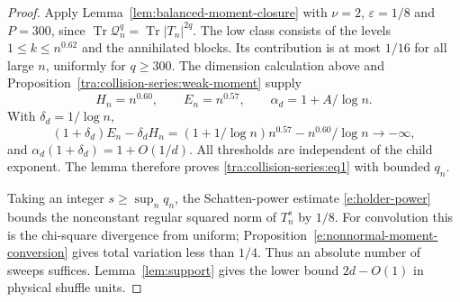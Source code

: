 \begin{proof}
Apply Lemma~\ref{lem:balanced-moment-closure} with
$\nu=2$, $\varepsilon=1/8$ and $P=300$, since
$\operatorname{Tr}\mathcal Q_n^q=\operatorname{Tr}|T_n|^{2q}$.
The low class consists of the levels $1\le k\le n^{0.62}$ and
the annihilated blocks. Its contribution is at most $1/16$ for all
large $n$, uniformly for $q\ge300$. The dimension calculation above
and Proposition~\ref{tra:collision-series:weak-moment} supply
\[
 H_n=n^{0.60},\qquad E_n=n^{0.57},\qquad
 \alpha_d=1+A/\log n.
\]
With $\delta_d=1/\log n$,
\[
 (1+\delta_d)E_n-\delta_dH_n
 =(1+1/\log n)n^{0.57}-n^{0.60}/\log n\longrightarrow-\infty,
\]
and $\alpha_d(1+\delta_d)=1+O(1/d)$. All thresholds are
independent of the child exponent. The lemma therefore proves
\eqref{tra:collision-series:eq1} with bounded $q_n$.

Taking an integer $s\ge\sup_nq_n$, the Schatten-power estimate
\eqref{e:holder-power} bounds the nonconstant regular squared norm
of $T_n^s$ by $1/8$. For convolution this is the chi-square
divergence from uniform; Proposition~\ref{e:nonnormal-moment-conversion}
gives total variation less than $1/4$. Thus an absolute number of
sweeps suffices. Lemma~\ref{lem:support} gives the lower bound
$2d-O(1)$ in physical shuffle units.
\end{proof}
